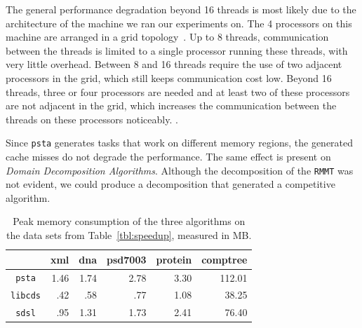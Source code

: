 The general performance degradation beyond 16 threads is most likely
due to the architecture of the machine we ran our experiments on.  The
4 processors on this machine are arranged in a grid
topology~\cite{Drepper2007}.  Up to 8 threads, communication between
the threads is limited to a single processor running these threads,
with very little overhead.  Between 8 and 16 threads require the use
of two adjacent processors in the grid, which still keeps
communication cost low.  Beyond 16 threads, three or four processors
are needed and at least two of these processors are not adjacent in
the grid, which increases the communication between the threads on
these processors noticeably.  .

Since {\tt psta} generates tasks that work on different memory
regions, the generated cache misses  do
not degrade the performance. The same effect is present on
\emph{Domain Decomposition Algorithms}. Although the decomposition of
the {\tt RMMT} was not evident, we could produce a decomposition that
generated a competitive algorithm.
	
\begin{table}[ht]
  \centering
  \begin{tabular}{crrrrr}
\hline
    & xml & dna & psd7003 & protein & comptree\\
\hline
 \verb|psta|   &  1.46  &  1.74  & 2.78  &  3.30 & 112.01\\
 \verb|libcds|   &  .42 &  .58 & .77 &  1.08 & 38.25\\
 \verb|sdsl|   &  .95 &  1.31 & 1.73 &  2.41 & 76.40\\
 \hline
\end{tabular}
\caption{Peak memory consumption of the three algorithms on the data sets
  from Table~\ref{tbl:speedup}, measured in MB.}
\label{tbl:memory_consumption}
\end{table}

